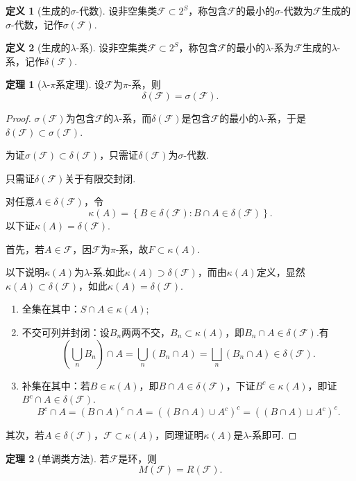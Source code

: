\documentclass[12pt]{ctexart}
\theoremstyle{definition}
\newtheorem{definition}{定义}
\newtheorem{theorem}{定理}
\theoremstyle{plain}
\begin{document}
	\begin{definition}[生成的$\sigma$-代数]
		设非空集类$\mathcal{F}\subset 2^S$，称包含$\mathcal{F}$的最小的$\sigma$-代数为$\mathcal{F}$生成的$\sigma$-代数，记作$\sigma(\mathcal{F})$.
	\end{definition}
	\begin{definition}[生成的$\lambda$-系]
		设非空集类$\mathcal{F}\subset 2^S$，称包含$\mathcal{F}$的最小的$\lambda$-系为$\mathcal{F}$生成的$\lambda$-系，记作$\delta(\mathcal{F})$.
	\end{definition}
	\begin{theorem}[$\lambda$-$\pi$系定理]
		设$\mathcal{F}$为$\pi$-系，则
		$$\delta(\mathcal{F})=\sigma(\mathcal{F}).$$
	\end{theorem}
	\begin{proof}
		$\sigma(\mathcal{F})$为包含$\mathcal{F}$的$\lambda$-系，而$\delta(\mathcal{F})$是包含$\mathcal{F}$的最小的$\lambda$-系，于是$\delta(\mathcal{F})\subset\sigma(\mathcal{F})$.
		
		为证$\sigma(\mathcal{F})\subset\delta(\mathcal{F})$，只需证$\delta(\mathcal{F})$为$\sigma$-代数.
		
		只需证$\delta(\mathcal{F})$关于有限交封闭.
		
		对任意$A\in\delta(\mathcal{F})$，令
		$$\kappa(A)=\left\{B\in\delta(\mathcal{F}):B\cap A\in\delta(\mathcal{F})\right\}.$$
		以下证$\kappa(A)=\delta(\mathcal{F})$.
		
		首先，若$A\in\mathcal{F}$，因$\mathcal{F}$为$\pi$-系，故$F\subset \kappa(A)$.
		
		以下说明$\kappa(A)$为$\lambda$-系.如此$\kappa(A)\supset\delta(\mathcal{F})$，而由$\kappa(A)$定义，显然$\kappa(A)\subset\delta(\mathcal{F})$，如此$\kappa(A)=\delta(\mathcal{F})$.
		
		\begin{enumerate}
			\item 全集在其中：$S\cap A\in\kappa(A)$;
			\item 不交可列并封闭：设$B_n$两两不交，$B_n\subset\kappa(A)$，即$B_n\cap A\in\delta(\mathcal{F})$.有
			$$\left(\bigcup_nB_n\right)\cap A=\bigcup_n\left(B_n\cap A\right)=\bigsqcup_n(B_n\cap A)\in\delta(\mathcal{F}).$$
			\item 补集在其中：若$B\in\kappa(A)$，即$B\cap A\in\delta(\mathcal{F})$，下证$B^c\in\kappa(A)$，即证$B^c\cap A\in\delta(\mathcal{F})$.
			$$B^c\cap A=(B\cap A)^c\cap A=\left((B\cap A)\cup A^c\right)^c=\left((B\cap A)\sqcup A^c\right)^c.$$
		\end{enumerate}
		
		其次，若$A\in\delta(\mathcal{F})$，$\mathcal{F}\subset\kappa(A)$，同理证明$\kappa(A)$是$\lambda$-系即可.
	\end{proof}
	\begin{theorem}[单调类方法]
		若$\mathcal{F}$是环，则
		$$M(\mathcal{F})=R(\mathcal{F}).$$
	\end{theorem}
\end{document}
